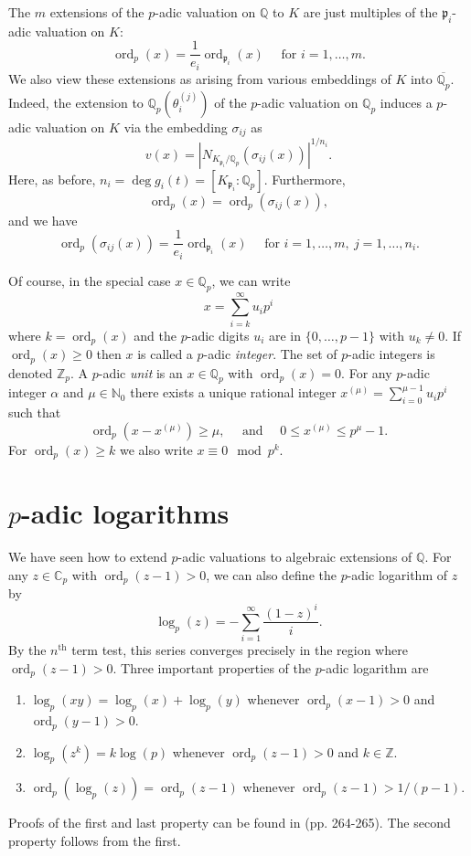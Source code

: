 \documentclass[11pt]{report}
\theoremstyle{definition}
\DeclareMathOperator{\ord}{ord}
\begin{document}
The $m$ extensions of the $p$-adic valuation on $\mathbb{Q}$ to $K$ are just multiples of the $\mathfrak{p}_i$-adic valuation on $K$:
\[\ord_p(x) = \frac{1}{e_i}\ord_{\mathfrak{p}_i}(x) \quad \text{ for } i = 1, \dots, m.\]
We also view these extensions as arising from various embeddings of $K$ into $\overline{\mathbb{Q}_p}$. Indeed, the extension to $\mathbb{Q}_p(\theta_i^{(j)})$ of the $p$-adic valuation on $\mathbb{Q}_p$ induces a $p$-adic valuation on $K$ via the embedding $\sigma_{ij}$ as
\[v(x) = |N_{K_{\mathfrak{p}_i}/\mathbb{Q}_p}(\sigma_{ij}(x))|^{1/n_i}.\]
Here, as before, $n_i = \deg g_i(t) = [K_{\mathfrak{p}_i} : \mathbb{Q}_p]$. Furthermore,
\[\ord_p(x) = \ord_p(\sigma_{ij}(x)),\]
and we have
\[\ord_p(\sigma_{ij}(x)) =  \frac{1}{e_i}\ord_{\mathfrak{p}_i}(x) \quad \text{ for } i = 1, \dots, m,\ j = 1, \dots, n_i.\]

Of course, in the special case $x \in \mathbb{Q}_p$, we can write
\[x = \sum_{i=k}^{\infty} u_ip^i\]
where $k = \ord_p(x)$ and the $p$-adic digits $u_i$ are in $\{0, \dots, p-1\}$ with $u_k \neq 0$. If $\ord_p(x) \geq 0$ then $x$ is called a $p$-adic \textit{integer}. The set of $p$-adic integers is denoted $\mathbb{Z}_p$. A $p$-adic \textit{unit} is an $x \in \mathbb{Q}_p$ with $\ord_p(x) = 0$. For any $p$-adic integer $\alpha$ and $\mu \in \mathbb{N}_0$ there exists a unique rational integer $x^{(\mu)} = \sum_{i=0}^{\mu-1}u_ip^i$ such that
\[\ord_p(x-x^{(\mu)}) \geq \mu, \quad \text{ and } \quad 0 \leq x^{(\mu)} \leq p^{\mu} - 1.\]
For $\ord_p(x) \geq k$ we also write $x \equiv 0 \mod{p^k}$.


\section{$p$-adic logarithms}
\label{sec:pAdicLogarithms}

We have seen how to extend $p$-adic valuations to algebraic extensions of $\mathbb{Q}$. For any $z \in \mathbb{C}_p$ with $\ord_p(z-1) > 0$, we can also define the $p$-adic logarithm of $z$ by
\[\log_p(z) = -\sum_{i=1}^{\infty} \frac{(1-z)^i}{i}.\]
By the $n^{\text{th}}$ term test, this series converges precisely in the region where ${\ord_p(z-1) > 0}$. Three important properties of the $p$-adic logarithm are
\begin{enumerate}
\item $\log_p(xy) = \log_p(x) + \log_p(y)$ whenever $\ord_p(x-1) > 0$ and $\ord_p(y-1) > 0$.
\item $\log_p(z^k) = k \log(p)$ whenever $\ord_p(z-1) > 0$ and $k \in \mathbb{Z}$.
\item $\ord_p(\log_p(z)) = \ord_p(z-1)$ whenever $\ord_p(z-1) > 1/(p-1)$.
\end{enumerate}
Proofs of the first and last property can be found in \cite{Has2} (pp. 264-265). The second property follows from the first.
\end{document}
